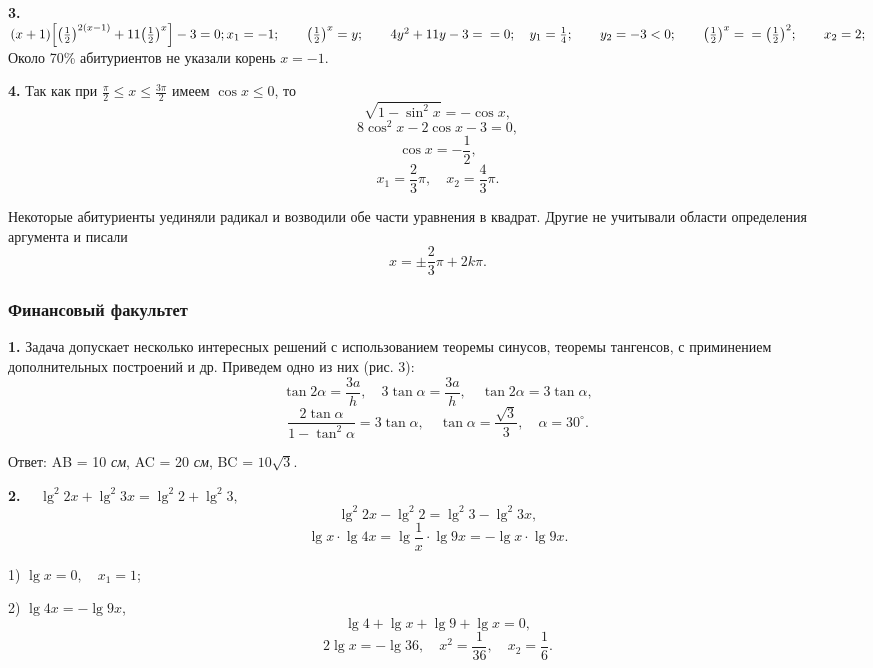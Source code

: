 \twocolumn
    \begin{doublespace}
        \textbf{3.} \((x + 1)\Big[\big(\frac{1}{2}\big)^{2(x-1)} + 11\big(\frac{1}{2}\big)^{x}\Big]-3=0; \\ x_1=-1;\qquad \big(\frac{1}{2}\big)^{x}=y;\qquad 4y^{2} + 11y -3=\\=0;\quad y_1=\frac{1}{4};\qquad y_2=-3<0;\qquad \big(\frac{1}{2}\big)^{x}=\\=\big(\frac{1}{2}\big)^{2};\qquad x_2=2;\)
        Около 70\% абитуриентов не указали корень \(x=-1\).
    \end{doublespace}\par
    \begin{doublespace}
        \textbf{4.} Так как при \(\frac{\pi}{2} \leq x \leq \frac{3\pi}{2}\) имеем \(\cos{x} \leq 0\), то
        \[\sqrt{1-\sin^2{x}}=-\cos{x},\]
        \[8\cos^2{x} - 2\cos{x} -3 =0,\]
        \[\cos{x}=-\frac{1}{2},\]
        \[x_1=\frac{2}{3}\pi,\quad x_2=\frac{4}{3}\pi.\]
    \end{doublespace}\par
    Некоторые абитуриенты уединяли радикал и возводили обе части уравнения в квадрат. Другие не учитывали области определения аргумента и писали
    \[x=\pm\frac{2}{3}\pi + 2k\pi.\]\par
    \begin{center}
    \subsubsection*{Финансовый факультет}
    \end{center}\par
    \textbf{1.} Задача допускает несколько интересных решений с использованием теоремы синусов, теоремы тангенсов, с приминением дополнительных построений и др. Приведем одно из них (рис. 3):
    \[\tan{2\alpha}=\frac{3a}{h},\quad 3\tan{\alpha}=\frac{3a}{h},\quad \tan{2\alpha}=3\tan{\alpha},\]
    \[\frac{2\tan{\alpha}}{1-\tan^2{\alpha}}=3\tan{\alpha}, \quad \tan{\alpha}=\frac{\sqrt{3}}{3}, \quad \alpha=30^\circ.\]\par
    Ответ: AB = 10 \textit{см}, AC = 20 \textit{см}, BC = \(10\sqrt{3}\). \par
    \begin{onehalfspace}
    \textbf{2. }
         \(\quad \lg^2{2x} + \lg^2{3x} = \lg^2{2} + \lg^2{3},\)
    \[\lg^2{2x} - \lg^2{2}= \lg^2{3} - \lg^2{3x},\]
    \[\lg{x} \cdot \lg{4x}=\lg{\frac{1}{x}} \cdot \lg{9x} = - \lg{x} \cdot \lg{9x}.\]\par
    1) \(\lg{x}=0, \quad x_1 = 1\); \par
    2) \(\lg{4x} = - \lg{9x}\),
    \[\lg{4} + \lg{x} + \lg{9} + \lg{x} = 0,\]
    \[2\lg{x} = -\lg{36}, \quad x^2 = \frac{1}{36}, \quad x_2 = \frac{1}{6}.\]\par
    \end{onehalfspace}

